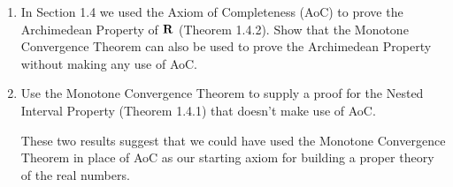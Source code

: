 \documentclass{lew98_solutions}
\begin{document}
\begin{exercise}
\label{ex:2.4.4}
    \begin{enumerate}
        \item In Section 1.4 we used the Axiom of Completeness (AoC) to prove the Archimedean Property of \( \mathbf{R} \) (Theorem 1.4.2). Show that the Monotone Convergence Theorem can also be used to prove the Archimedean Property without making any use of AoC.

        \item Use the Monotone Convergence Theorem to supply a proof for the Nested Interval Property (Theorem 1.4.1) that doesn't make use of AoC.

        These two results suggest that we could have used the Monotone Convergence Theorem in place of AoC as our starting axiom for building a proper theory of the real numbers.
    \end{enumerate}
\end{exercise}
\end{document}

